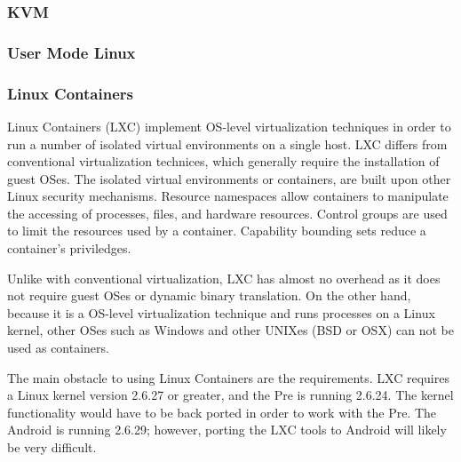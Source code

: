 \subsubsection{KVM}
\subsubsection{User Mode Linux}
\subsubsection{Linux Containers}
Linux Containers (LXC) implement OS-level virtualization techniques in order to run a number of isolated virtual environments on a single host.  LXC differs from conventional virtualization technices, which generally require the installation of guest OSes.  The isolated virtual environments or containers, are built upon other Linux security mechanisms.  Resource namespaces allow containers to manipulate the accessing of processes, files, and hardware resources.  Control groups are used to limit the resources used by a container.  Capability bounding sets reduce a container's priviledges.  

Unlike with conventional virtualization, LXC has almost no overhead as it does not require guest OSes or dynamic binary translation.  On the other hand, because it is a OS-level virtualization technique and runs processes on a Linux kernel, other OSes such as Windows and other UNIXes (BSD or OSX) can not be used as containers.  

The main obstacle to using Linux Containers are the requirements.  LXC requires a Linux kernel version 2.6.27 or greater, and the Pre is running 2.6.24.  The kernel functionality would have to be back ported in order to work with the Pre.  The Android is running 2.6.29; however, porting the LXC tools to Android will likely be very difficult.

